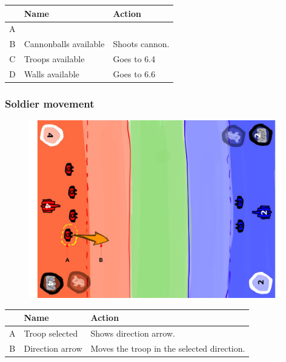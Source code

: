 \documentclass[12pt,a4paper]{article}
\begin{document}
\begin{table}[H]
\small
\centering
\begin{tabular}{c|p{5cm}|p{7cm}}
& Name & Action \\ \hline\hline
A
&
&
\\B
&Cannonballs available 
&Shoots cannon.
\\C
&Troops available
&Goes to 6.4
\\D
&Walls available
&Goes to 6.6
\end{tabular}
\end{table}


\subsubsection{Soldier movement}

\begin{figure}[H]
  \centering
  \includegraphics[width=11cm]{pic/mocks/6-4.pdf}
\end{figure}

\begin{table}[H]
\small
\centering
\begin{tabular}{c|p{5cm}|p{7cm}}
& Name & Action \\ \hline\hline
A
&Troop selected
&Shows direction arrow.
\\B
&Direction arrow 
&Moves the troop in the selected direction.
\end{tabular}
\end{table}


\newpage
\end{document}
